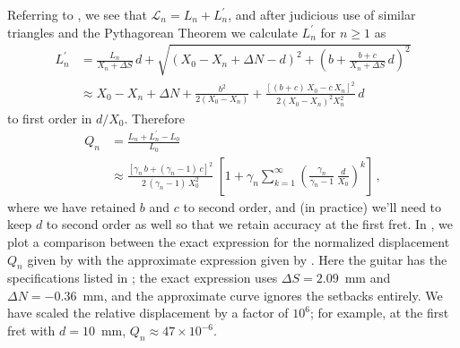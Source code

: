 Referring to , we see that $\mathcal{L}_n = L_n + L^\prime_n$, and after judicious use of similar triangles and the Pythagorean Theorem we calculate $L^\prime_n$ for $n \ge 1$ as
\begin{equation} \label{eqn:l_p_def}
    \begin{split}
        L^\prime_n &= \frac{L_n}{X_n + \Delta S}\, d + \sqrt{\left(X_0 - X_n + \Delta N - d\right)^2 + \left(b + \frac{b + c}{X_n + \Delta S}\, d\right)^2} \\
        &\approx X_0 - X_n + \Delta N + \frac{b^2}{2 \left(X_0 - X_n\right)} + \frac{\left[(b + c)\, X_0 - c\, X_n\right]^2}{2 (X_0 - X_n)^2 X_n^2}\, d
    \end{split}
\end{equation}
to first order in $d/X_0$. Therefore
\begin{equation} \label{eqn:q_n_approx}
  \begin{split}
    Q_n &= \frac{L_n + L_n^\prime - L_0}{L_0} \\
    & \approx \frac{\left[ \gamma_n\, b + (\gamma_n - 1)\, c \right]^2}{2\, (\gamma_n - 1)\, X_0^2} \ \left[ 1 + \gamma_n \sum_{k = 1}^\infty \left(\frac{\gamma_n}{\gamma_n - 1}\, {\frac{d}{X_0}}\right)^k \right]\, ,
  \end{split}
\end{equation}
where we have retained $b$ and $c$ to second order, and (in practice) we'll need to keep $d$ to second order as well so that we retain accuracy at the first fret. In , we plot a comparison between the exact expression for the normalized displacement $Q_n$ given by  with the approximate expression given by . Here the guitar has the specifications listed in ; the exact expression uses $\Delta S = 2.09$~mm and $\Delta N = -0.36$~mm, and the approximate curve ignores the setbacks entirely. We have scaled the relative displacement by a factor of $10^6$; for example, at the first fret with $d = 10$~mm, $Q_n \approx 47 \times 10^{-6}$. 


